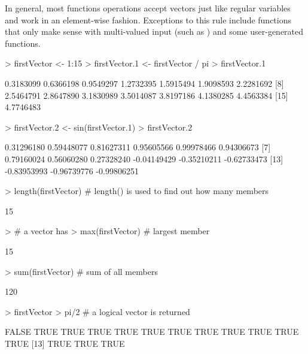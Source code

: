 \documentclass[10pt,letterpaper]{article}
\begin{document}
In general, most functions operations accept vectors just like regular variables and work in an element-wise fashion.  Exceptions to this rule include functions that only make sense with multi-valued input (such as ) and some user-generated functions.
\begin{Schunk}
\begin{Sinput}
> firstVector <- 1:15
> firstVector.1 <- firstVector / pi
> firstVector.1
\end{Sinput}
\begin{Soutput}
 [1] 0.3183099 0.6366198 0.9549297 1.2732395 1.5915494 1.9098593 2.2281692
 [8] 2.5464791 2.8647890 3.1830989 3.5014087 3.8197186 4.1380285 4.4563384
[15] 4.7746483
\end{Soutput}
\begin{Sinput}
> firstVector.2 <- sin(firstVector.1)
> firstVector.2
\end{Sinput}
\begin{Soutput}
 [1]  0.31296180  0.59448077  0.81627311  0.95605566  0.99978466  0.94306673
 [7]  0.79160024  0.56060280  0.27328240 -0.04149429 -0.35210211 -0.62733473
[13] -0.83953993 -0.96739776 -0.99806251
\end{Soutput}
\begin{Sinput}
> length(firstVector)           # length() is used to find out how many members
\end{Sinput}
\begin{Soutput}
[1] 15
\end{Soutput}
\begin{Sinput}
>                               # a vector has
> max(firstVector)              # largest member
\end{Sinput}
\begin{Soutput}
[1] 15
\end{Soutput}
\begin{Sinput}
> sum(firstVector)              # sum of all members
\end{Sinput}
\begin{Soutput}
[1] 120
\end{Soutput}
\begin{Sinput}
> firstVector > pi/2            # a logical vector is returned
\end{Sinput}
\begin{Soutput}
 [1] FALSE  TRUE  TRUE  TRUE  TRUE  TRUE  TRUE  TRUE  TRUE  TRUE  TRUE  TRUE
[13]  TRUE  TRUE  TRUE
\end{Soutput}
\end{Schunk}
\end{document}
